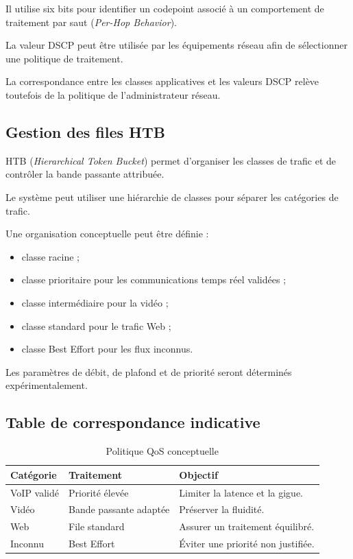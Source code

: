 Il utilise six bits pour identifier un codepoint
associé à un comportement de traitement par saut
(\textit{Per-Hop Behavior}).

La valeur DSCP peut être utilisée par les équipements
réseau afin de sélectionner une politique de traitement.

La correspondance entre les classes applicatives
et les valeurs DSCP relève toutefois de la politique
de l'administrateur réseau.

\subsection{Gestion des files HTB}

HTB (\textit{Hierarchical Token Bucket}) permet
d'organiser les classes de trafic et de contrôler
la bande passante attribuée.

Le système peut utiliser une hiérarchie de classes
pour séparer les catégories de trafic.

Une organisation conceptuelle peut être définie :

\begin{itemize}
    \item classe racine ;
    \item classe prioritaire pour les communications
    temps réel validées ;
    \item classe intermédiaire pour la vidéo ;
    \item classe standard pour le trafic Web ;
    \item classe Best Effort pour les flux inconnus.
\end{itemize}

Les paramètres de débit, de plafond et de priorité
seront déterminés expérimentalement.

\subsection{Table de correspondance indicative}

\begin{table}[H]
\centering
\caption{Politique QoS conceptuelle}
\label{tab:politique_qos}
\begin{tabularx}{\textwidth}{|l|l|X|}
\hline
\textbf{Catégorie} & \textbf{Traitement} &
\textbf{Objectif} \\
\hline
VoIP validé &
Priorité élevée &
Limiter la latence et la gigue. \\
\hline
Vidéo &
Bande passante adaptée &
Préserver la fluidité. \\
\hline
Web &
File standard &
Assurer un traitement équilibré. \\
\hline
Inconnu &
Best Effort &
Éviter une priorité non justifiée. \\
\hline
\end{tabularx}
\end{table}

